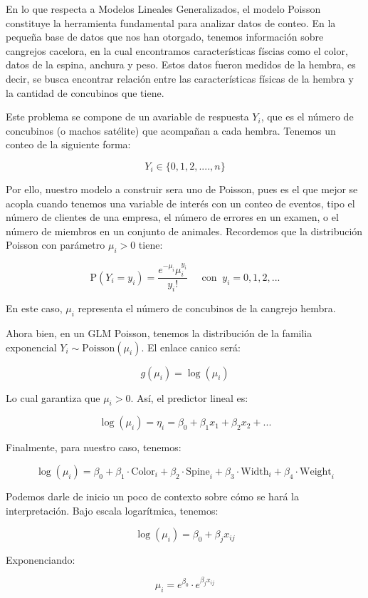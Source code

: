 En lo que respecta a Modelos Lineales Generalizados, el modelo Poisson constituye la herramienta
fundamental para analizar datos de conteo. En la pequeña base de datos que nos han otorgado, tenemos 
información sobre cangrejos cacelora, en la cual encontramos características físcias como el color, 
datos de la espina, anchura y peso. Estos datos fueron medidos de la hembra, es decir, se busca 
encontrar relación entre las características físicas de la hembra y la cantidad de concubinos que 
tiene. 

Este problema se compone de un avariable de respuesta $Y_i$, que es el número de concubinos (o machos satélite)
que acompañan a cada hembra. Tenemos un conteo de la siguiente forma:

\[
    Y_i \in \{0, 1, 2, ...., n\}
\]

Por ello, nuestro modelo a construir sera uno de Poisson, pues es el que mejor se acopla cuando tenemos 
una variable de interés con un conteo de eventos, tipo el número de clientes de una empresa, el número
de errores en un examen, o el número de miembros en un conjunto de animales. Recordemos que la distribución
Poisson con parámetro $\mu_i > 0$ tiene:

\[
    \text{P}(Y_i = y_i) = \frac{e^{-\mu_i} \mu_i^{y_i}}{y_i !} \;\;\;\;\; \text{con} \;\; y_i = 0,1,2,...
\]

En este caso, $\mu_i$ representa el número de concubinos de la cangrejo hembra. 

Ahora bien, en un GLM Poisson, tenemos la distribución de la familia exponencial $Y_i \sim \text{Poisson}(\mu_i)$. 
El enlace canico será:

\[
    g(\mu_i) = \log(\mu_i)
\]

Lo cual garantiza que $\mu_i > 0$. Así, el predictor lineal es:

\[
    \log(\mu_i) = \eta_i = \beta_0 + \beta_1 x_1 + \beta_2 x_2 + ...
\]

Finalmente, para nuestro caso, tenemos:

\[
    \log(\mu_i) = \beta_0 + \beta_1 \cdot \text{Color}_i + \beta_2 \cdot \text{Spine}_i + \beta_3 \cdot \text{Width}_i + \beta_4 \cdot \text{Weight}_i
\]

Podemos darle de inicio un poco de contexto sobre cómo se hará la interpretación. Bajo escala logarítmica,
tenemos:

\[
    \log(\mu_i) = \beta_0 + \beta_j x_{ij}
\] 

Exponenciando:

\[
    \mu_i = e^{\beta_0} \cdot e^{\beta_j x_{ij}}
\]

